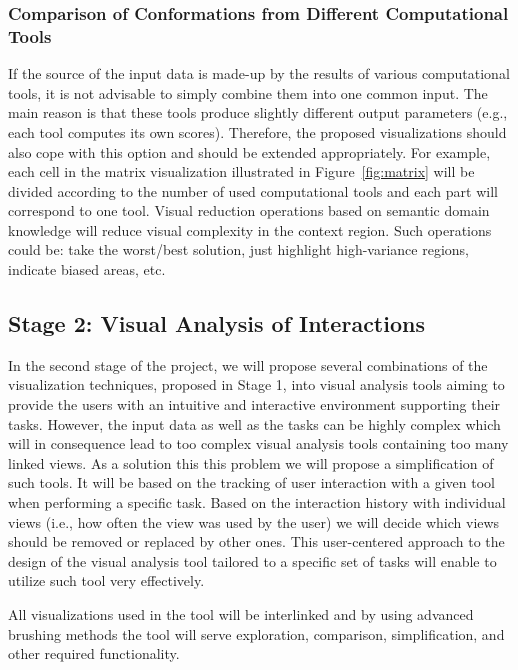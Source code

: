 \documentclass[11pt,a4paper,titlepage,oneside,onecolumn]{article}
\begin{document}
\subsubsection{Comparison of Conformations from Different Computational Tools}
If the source of the input data is made-up by the results of various computational tools, it is not advisable to simply combine them into one common input.
The main reason is that these tools produce slightly different output parameters (e.g., each tool computes its own scores). 
Therefore, the proposed visualizations should also cope with this option and should be extended appropriately. 
For example, each cell in the matrix visualization illustrated in Figure~\ref{fig:matrix} will be divided according to the number of used computational tools and each part will correspond to one tool.
Visual reduction operations based on semantic domain knowledge will reduce visual complexity in the context region.
Such operations could be: take the worst/best solution, just highlight high-variance regions, indicate biased areas, etc.



\subsection{Stage 2: Visual Analysis of Interactions}
In the second stage of the project, we will propose several combinations of the visualization techniques, proposed in Stage 1, into visual analysis tools aiming to provide the users with an intuitive and interactive environment supporting their tasks.
However, the input data as well as the tasks can be highly complex which will in consequence lead to too complex visual analysis tools containing too many linked views.
As a solution this this problem we will propose a simplification of such tools.
It will be based on the tracking of user interaction with a given tool when performing a specific task.
Based on the interaction history with individual views (i.e., how often the view was used by the user) we will decide which views should be removed or replaced by other ones. 
This user-centered approach to the design of the visual analysis tool tailored to a specific set of tasks will enable to utilize such tool very effectively.

All visualizations used in the tool will be interlinked and by using advanced brushing methods the tool will serve exploration, comparison, simplification, and other required functionality.
\end{document}
